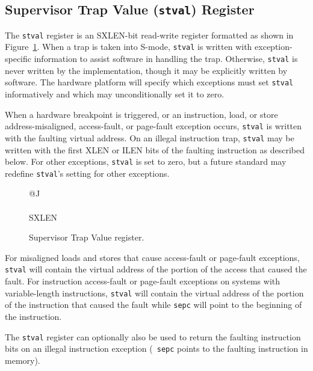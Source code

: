 \subsection{Supervisor Trap Value ({\tt stval}) Register}

The {\tt stval} register is an SXLEN-bit read-write register formatted as shown
in Figure~\ref{stvalreg}.  When a trap is taken into S-mode, {\tt stval} is
written with exception-specific information to assist software in handling the
trap.  Otherwise, {\tt stval} is never written by the implementation, though
it may be explicitly written by software.  The hardware platform will specify
which exceptions must set {\tt stval} informatively and which may
unconditionally set it to zero.


When a hardware breakpoint is triggered, or an instruction, load, or
store address-misaligned, access-fault, or page-fault exception occurs, {\tt stval}
is written with the faulting virtual address.  On an illegal instruction trap,
{\tt stval} may be written with the first XLEN or ILEN bits of the faulting
instruction as described below.  For other exceptions, {\tt stval} is set to
zero, but a future standard may redefine {\tt stval}'s setting for other
exceptions.

\begin{figure}[h!]
{\footnotesize
\begin{center}
\begin{tabular}{@{}J}
 \\
\hline
{} \\
\hline
SXLEN \\
\end{tabular}
\end{center}
}
\vspace{-0.1in}
\caption{Supervisor Trap Value register.}
\label{stvalreg}
\end{figure}

For misaligned loads and stores that cause access-fault or page-fault
exceptions, {\tt stval} will contain the virtual address of the
portion of the access that caused the fault.  For
instruction access-fault or page-fault exceptions on systems
with variable-length instructions, {\tt stval} will contain the
virtual address of the portion of the instruction that caused
the fault while {\tt sepc} will point to the beginning of the
instruction.

The {\tt stval} register can optionally also be used to return the
faulting instruction bits on an illegal instruction exception ({\tt
  sepc} points to the faulting instruction in memory).

